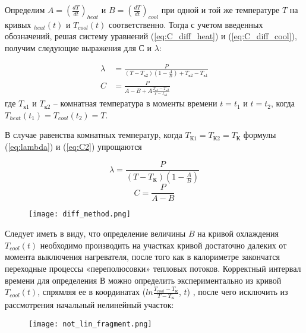 Определим $A = \left( \frac{dT}{dt} \right)_{heat}$ и $B = \left( \frac{dT}{dt} \right)_{cool}$ при одной и той же температуре $T$ на кривых $_{heat}(t)$ и $T_{cool}(t)$ соответственно. Тогда с учетом введенных обозначений, решая систему уравнений (\ref{eq:C_diff_heat}) и (\ref{eq:C_diff_cool}), получим следующие выражения для $С$ и $\lambda$:

\begin{align}
    \lambda &= \frac{P}{(T - T_{к2})(1 - \frac{A}{B}) + T_{к2} - T_{к1}} \label{eq:lambda}\\
    C &= \frac{P}{A - B + A \frac{T_{к1} - T_{к2}}{T - T_{к1}}} \label{eq:C2}
\end{align}
где $T_{к1}$ и $T_{к2}$ -- комнатная температура в моменты времени $t = t_1$ и $t = t_2$, когда $T_{heat}(t_1) = T_{cool}(t_2) = T$.

В случае равенства комнатных температур, когда $T_{\text{К}1} = T_{\text{К}2} = T_\text{К}$ формулы (\ref{eq:lambda}) и (\ref{eq:C2}) упрощаются

\begin{equation}
    \lambda = \frac{P}{(T - T_\text{К})(1 - \frac{A}{B})}
    \label{eq:lambda_fin}
\end{equation}
\begin{equation}
    C = \frac{P}{A - B}
    \label{eq:C_fin}
\end{equation}

\begin{figure}[ht]
    \centering
    \texttt{[image: diff\_method.png]}
\end{figure}

Следует иметь в виду, что определение величины $B$ на кривой охлаждения $T_{cool}(t)$ необходимо производить на участках кривой достаточно далеких от момента выключения нагревателя, после того как в калориметре закончатся переходные процессы «переполюсовки» тепловых потоков. Корректный интервал времени для определения В можно определить экспериментально из кривой $T_{cool}(t)$, спрямляя ее в координатах ($ln \frac{T_{cool} - T_\text{К}}{T - T_\text{К}}$, $t$) , после чего исключить из рассмотрения начальный нелинейный участок:

\begin{figure}[ht]
    \centering
    \texttt{[image: not\_lin\_fragment.png]}
\end{figure}
